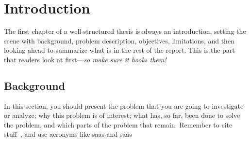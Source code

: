 \chapter{Introduction}
The first chapter of a well-structured thesis is always an introduction, setting the scene with background, problem description, objectives, limitations, and then looking ahead to summarize what is in the rest of the report. This is the part that readers look at first---\emph{so make sure it hooks them!}

\section{Background}
In this section, you should present the problem that you are going to investigate or analyze; why this problem is of interest; what has, so far, been done to solve the problem, and which parts of the problem that remain.
Remember to cite stuff~\cite{FowlerTechnicalDebt}, and use acronyms like \gls{saas} and \gls{saas}
